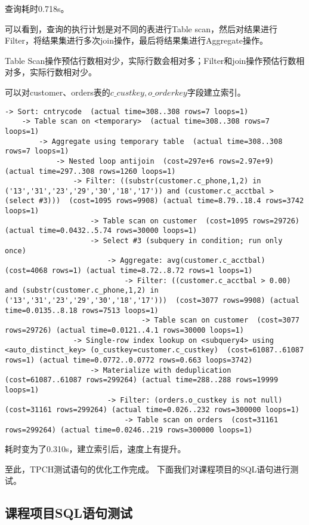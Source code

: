 \documentclass{article}
\begin{document}
查询耗时0.718s。

可以看到，查询的执行计划是对不同的表进行Table scan，然后对结果进行Filter，将结果集进行多次join操作，最后将结果集进行Aggregate操作。

Table Scan操作预估行数相对少，实际行数会相对多；Filter和join操作预估行数相对多，实际行数相对少。

可以对customer、orders表的$c\_custkey,o\_orderkey$字段建立索引。

\begin{lstlisting}
-> Sort: cntrycode  (actual time=308..308 rows=7 loops=1)
    -> Table scan on <temporary>  (actual time=308..308 rows=7 loops=1)
        -> Aggregate using temporary table  (actual time=308..308 rows=7 loops=1)
            -> Nested loop antijoin  (cost=297e+6 rows=2.97e+9) (actual time=297..308 rows=1260 loops=1)
                -> Filter: ((substr(customer.c_phone,1,2) in ('13','31','23','29','30','18','17')) and (customer.c_acctbal > (select #3)))  (cost=1095 rows=9908) (actual time=8.79..18.4 rows=3742 loops=1)
                    -> Table scan on customer  (cost=1095 rows=29726) (actual time=0.0432..5.74 rows=30000 loops=1)
                    -> Select #3 (subquery in condition; run only once)
                        -> Aggregate: avg(customer.c_acctbal)  (cost=4068 rows=1) (actual time=8.72..8.72 rows=1 loops=1)
                            -> Filter: ((customer.c_acctbal > 0.00) and (substr(customer.c_phone,1,2) in ('13','31','23','29','30','18','17')))  (cost=3077 rows=9908) (actual time=0.0135..8.18 rows=7513 loops=1)
                                -> Table scan on customer  (cost=3077 rows=29726) (actual time=0.0121..4.1 rows=30000 loops=1)
                -> Single-row index lookup on <subquery4> using <auto_distinct_key> (o_custkey=customer.c_custkey)  (cost=61087..61087 rows=1) (actual time=0.0772..0.0772 rows=0.663 loops=3742)
                    -> Materialize with deduplication  (cost=61087..61087 rows=299264) (actual time=288..288 rows=19999 loops=1)
                        -> Filter: (orders.o_custkey is not null)  (cost=31161 rows=299264) (actual time=0.026..232 rows=300000 loops=1)
                            -> Table scan on orders  (cost=31161 rows=299264) (actual time=0.0246..219 rows=300000 loops=1)
\end{lstlisting}

耗时变为了0.310s，建立索引后，速度上有提升。

至此，TPCH测试语句的优化工作完成。  
下面我们对课程项目的SQL语句进行测试。

\subsection{课程项目SQL语句测试}
\end{document}
